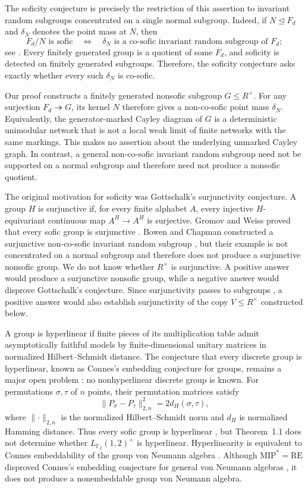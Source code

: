 \documentclass[10pt]{article}
\newcommand{\F}{\mathbb{F}}
\begin{document}
The soficity conjecture is precisely the restriction of this assertion to invariant random subgroups concentrated on a single normal subgroup. Indeed, if $N\trianglelefteq F_d$ and $\delta_N$ denotes the point mass at $N$, then
\[
F_d/N\text{ is sofic}\quad\Longleftrightarrow\quad \delta_N\text{ is a co-sofic invariant random subgroup of }F_d;
\]
see \cite[Section~6, Proposition~6.1]{Gel18}. Every finitely generated group is a quotient of some $F_d$, and soficity is detected on finitely generated subgroups. Therefore, the soficity conjecture asks exactly whether every such $\delta_N$ is co-sofic.

Our proof constructs a finitely generated nonsofic subgroup $G\leq R^\times$. For any surjection $F_d\twoheadrightarrow G$, its kernel $N$ therefore gives a non-co-sofic point mass $\delta_N$. Equivalently, the generator-marked Cayley diagram of $G$ is a deterministic unimodular network that is not a local weak limit of finite networks with the same markings. This makes no assertion about the underlying unmarked Cayley graph. In contrast, a general non-co-sofic invariant random subgroup need not be supported on a normal subgroup and therefore need not produce a nonsofic quotient.

The original motivation for soficity was Gottschalk's surjunctivity conjecture. A group $H$ is surjunctive if, for every finite alphabet $A$, every injective $H$-equivariant continuous map $A^H\to A^H$ is surjective. Gromov and Weiss proved that every sofic group is surjunctive \cite{Gro99,Wei00}. Bowen and Chapman constructed a surjunctive non-co-sofic invariant random subgroup \cite{BC25}, but their example is not concentrated on a normal subgroup and therefore does not produce a surjunctive nonsofic group. We do not know whether $R^\times$ is surjunctive. A positive answer would produce a surjunctive nonsofic group, while a negative answer would disprove Gottschalk's conjecture. Since surjunctivity passes to subgroups \cite[Lemma~1.1]{Wei00}, a positive answer would also establish surjunctivity of the copy $V\leq R^\times$ constructed below.

A group is hyperlinear if finite pieces of its multiplication table admit asymptotically faithful models by finite-dimensional unitary matrices in normalized Hilbert--Schmidt distance. The conjecture that every discrete group is hyperlinear, known as Connes's embedding conjecture for groups, remains a major open problem \cite[Open Question~3.9]{Pes08}: no nonhyperlinear discrete group is known. For permutations $\sigma,\tau$ of $n$ points, their permutation matrices satisfy
\[
\lVert P_\sigma-P_\tau\rVert_{2,n}^2=2d_H(\sigma,\tau),
\]
where $\lVert\cdot\rVert_{2,n}$ is the normalized Hilbert--Schmidt norm and $d_H$ is normalized Hamming distance. Thus every sofic group is hyperlinear \cite[Theorem~3.3]{Pes08}, but Theorem~1.1 does not determine whether $L_{\F_2}(1,2)^\times$ is hyperlinear. Hyperlinearity is equivalent to Connes embeddability of the group von Neumann algebra \cite[Theorem~8.5]{Pes08}. Although $\mathrm{MIP}^{\ast}=\mathrm{RE}$ disproved Connes's embedding conjecture for general von Neumann algebras \cite{JNVWY20}, it does not produce a nonembeddable group von Neumann algebra.
\end{document}
